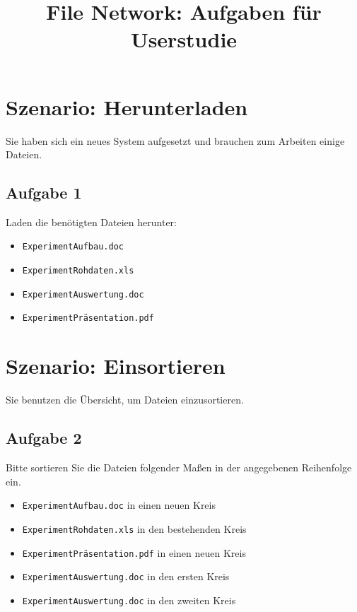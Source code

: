 \documentclass[12pt,]{article}
\title{File Network: Aufgaben für Userstudie}
\author{}
\date{}
\begin{document}
\maketitle

\newpage

\section{Szenario: Herunterladen}

Sie haben sich ein neues System aufgesetzt und brauchen zum Arbeiten
einige Dateien.

\subsection{Aufgabe 1}

Laden die benötigten Dateien herunter:

\begin{itemize}
\item
  \texttt{ExperimentAufbau.doc}
\item
  \texttt{ExperimentRohdaten.xls}
\item
  \texttt{ExperimentAuswertung.doc}
\item
  \texttt{ExperimentPräsentation.pdf}
\end{itemize}

\newpage

\section{Szenario: Einsortieren}

Sie benutzen die Übersicht, um Dateien einzusortieren.

\subsection{Aufgabe 2}

Bitte sortieren Sie die Dateien folgender Maßen in der angegebenen
Reihenfolge ein.

\begin{itemize}
\item
  \texttt{ExperimentAufbau.doc} in einen neuen Kreis
\item
  \texttt{ExperimentRohdaten.xls} in den bestehenden Kreis
\item
  \texttt{ExperimentPräsentation.pdf} in einen neuen Kreis
\item
  \texttt{ExperimentAuswertung.doc} in den ersten Kreis
\item
  \texttt{ExperimentAuswertung.doc} in den zweiten Kreis
\end{itemize}
\end{document}
